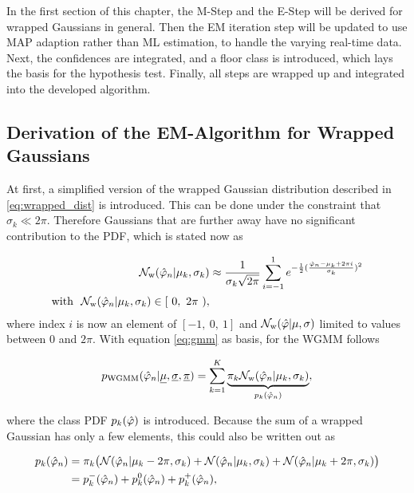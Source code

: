 In the first section of this chapter, the M-Step and the E-Step will be derived for wrapped Gaussians in general.
Then the \ac{EM} iteration step will be updated to use \ac{MAP} adaption rather than \ac{ML} estimation, to handle the varying real-time data. Next, the confidences are integrated, and a floor class is introduced, which lays the basis for the hypothesis test. Finally,
all steps are wrapped up and integrated into the developed algorithm.

\subsection{Derivation of the EM-Algorithm for Wrapped Gaussians}
\label{subsec:EM_for_WGMM}
At first, a simplified version of the wrapped Gaussian distribution described in \ref{eq:wrapped_dist} is introduced. This can be done under the constraint that $\sigma_k \ll 2\pi$. Therefore Gaussians that are further away have no significant contribution to the \ac{PDF}, which is stated now as

\begin{equation}
\begin{split}
\mathcal{N}_\text{w}(\phih_n|\mu_k,\sigma_k)&\approx\frac{1}{\sigma_k\sqrt{2\pi}}\sum^1_{i=-1}e^{-\frac{1}{2}(\frac{\phih_n-\mu_k+2\pi i}{\sigma_k})^2}\\
\text{with }\ \mathcal{N}_\text{w}(\phih_n|\mu_k,\sigma_k) \in [\ 0,\ 2\pi\ ),
\end{split}
\end{equation}
where index $i$ is now an element of $[-1,\ 0,\ 1]$ and $\mathcal{N}_\text{w}(\hat{\varphi}|\mu,\sigma)$
limited to values between $0$ and $2\pi$. With equation \ref{eq:gmm} as basis, for the \ac{WGMM} follows

\begin{equation}
p_{\text{WGMM}}(\hat{\varphi}_n|\underline{\mu}, \underline{\sigma}, \underline{\pi})= \sum^K_{k=1}\underbrace{\pi_k\mathcal{N}_\text{w}(\hat{\varphi}_n|\mu_k,\sigma_k)}_{p_k(\hat{\varphi}_n)},
\label{eq:wgmm}
\end{equation}

where the class PDF $p_k(\hat{\varphi})$ is introduced. Because the sum of a wrapped Gaussian has only a few elements, this could also be written out as

\begin{equation}
\begin{split}
p_k(\hat{\varphi}_n) &= \pi_k\big(\mathcal{N}(\hat{\varphi}_n|\mu_k-2\pi,\sigma_k) + \mathcal{N}(\hat{\varphi}_n|\mu_k,\sigma_k) + \mathcal{N}(\hat{\varphi}_n|\mu_k+2\pi,\sigma_k)\big)\\
 &= p^-_k(\hat{\varphi}_n) + p^0_k(\hat{\varphi}_n) + p^+_k(\hat{\varphi}_n),
\end{split}
\end{equation}

